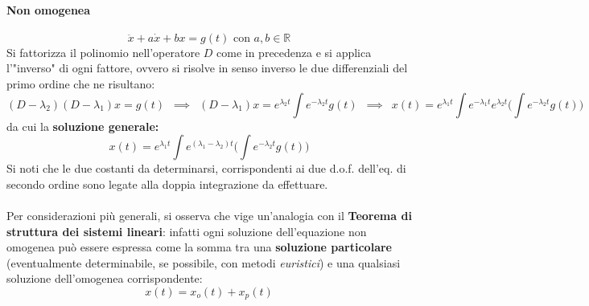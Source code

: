 \documentclass[10pt]{article}
\theoremstyle{plain}
\begin{document}
\paragraph*{Non omogenea}
\[\ddot x + a \dot x + b x = g(t) \textrm{ con } a, b \in \mathbb{R}\]
Si fattorizza il polinomio nell'operatore $D$ come in precedenza e si applica l'"inverso" di ogni fattore, ovvero si risolve in senso inverso le due differenziali del primo ordine che ne risultano:
\[(D - \lambda_2) (D - \lambda_1) x = g(t) \enspace \implies \enspace (D - \lambda_1) x = e^{\lambda_2 t} \int e^{- \lambda_2 t} g(t) \enspace \implies \enspace x(t) = e^{\lambda_1 t}\int e^{- \lambda_1 t} e^{\lambda_2 t} \bigg(\int e^{- \lambda_2 t}g(t)\bigg)\]
da cui la \textbf{soluzione generale:}
\[\boxed{x(t) = e^{\lambda_1 t}\int e^{(\lambda_1 - \lambda_2) t} \bigg(\int e^{- \lambda_2 t}g(t)\bigg)}\]
Si noti che le due costanti da determinarsi, corrispondenti ai due d.o.f. dell'eq. di secondo ordine sono legate alla doppia integrazione da effettuare.
\\~\\Per considerazioni più generali, si osserva che vige un'analogia con il \textbf{Teorema di struttura dei sistemi lineari}: infatti ogni soluzione dell'equazione non omogenea può essere espressa come la somma tra una \textbf{soluzione particolare} (eventualmente determinabile, se possibile, con metodi \textit{euristici}) e una qualsiasi soluzione dell'omogenea corrispondente:
\[x(t) = x_o(t) + x_p(t)\]
\end{document}

